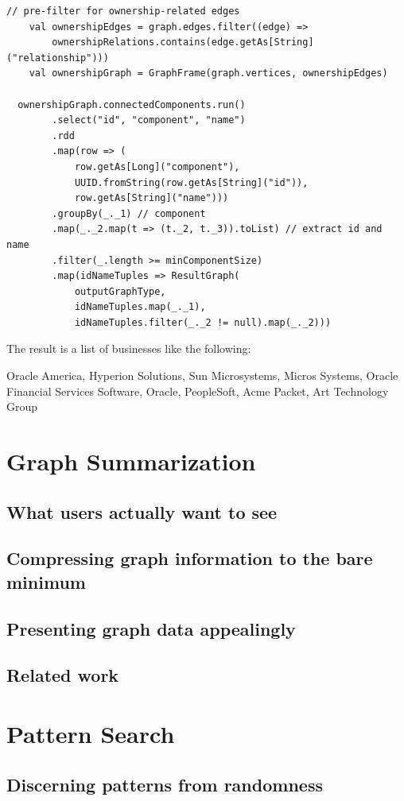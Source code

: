 \documentclass[
        a4paper,     %
        titlepage,   %
        oneside,     %
        parskip      %
        ]{scrartcl}  %
\begin{document}
  \begin{lstlisting}[style=scalaStyle,caption=processGraph in $CompanyGroupExtractor$]
  // pre-filter for ownership-related edges
	val ownershipEdges = graph.edges.filter((edge) =>
		ownershipRelations.contains(edge.getAs[String]("relationship")))
	val ownershipGraph = GraphFrame(graph.vertices, ownershipEdges)

  ownershipGraph.connectedComponents.run()
		.select("id", "component", "name")
		.rdd
		.map(row => (
			row.getAs[Long]("component"),
			UUID.fromString(row.getAs[String]("id")),
			row.getAs[String]("name")))
		.groupBy(_._1) // component
		.map(_._2.map(t => (t._2, t._3)).toList) // extract id and name
		.filter(_.length >= minComponentSize)
		.map(idNameTuples => ResultGraph(
			outputGraphType,
			idNameTuples.map(_._1),
			idNameTuples.filter(_._2 != null).map(_._2)))
  \end{lstlisting}

  The result is a list of businesses like the following:

  Oracle America, Hyperion Solutions, Sun Microsystems, Micros Systems, Oracle Financial Services Software, Oracle, PeopleSoft, Acme Packet, Art Technology Group


  \section{Graph Summarization}
    \subsection{What users actually want to see}
    \subsection{Compressing graph information to the bare minimum}
    \subsection{Presenting graph data appealingly}
    \subsection{Related work}
    \pagebreak

  \section{Pattern Search}
    \subsection{Discerning patterns from randomness}
\end{document}
